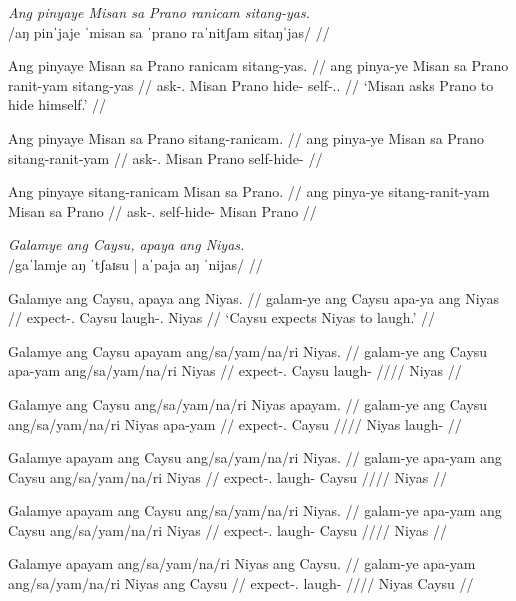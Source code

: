 \documentclass[12pt,a4paper]{scrartcl}
\newcommand{\TsgM}{{\Tsg}.{\M}}
\newcommand{\TsgF}{{\Tsg}.{\F}}
\begin{document}
\pex
\a\begingl
\glpreamble \textit{Ang pinyaye Misan sa Prano ranicam sitang-yas.} \\
	/aŋ pinˈjaje ˈmisan sa ˈprano raˈnitʃam sitaŋˈjas/ //

\gla Ang pinyaye Misan sa Prano ranicam sitang-yas. //
\glb ang pinya-ye Misan sa Prano ranit-yam sitang-yas //
\glc \AgtT{} ask-\TsgF{} Misan \Parg{} Prano hide-\Ptcp{} self-\TsgM{}.\Parg{} //
\glft `Misan asks Prano to hide himself.' //
\endgl

\a\begingl
\gla Ang pinyaye Misan sa Prano sitang-ranicam. //
\glb ang pinya-ye Misan sa Prano sitang-ranit-yam //
\glc \AgtT{} ask-\TsgF{} Misan \Parg{} Prano self-hide-\Ptcp{} //
\endgl

\a\begingl
\gla Ang pinyaye sitang-ranicam Misan sa Prano. //
\glb ang pinya-ye sitang-ranit-yam Misan sa Prano //
\glc \AgtT{} ask-\TsgF{} self-hide-\Ptcp{} Misan \Parg{} Prano //
\endgl
\xe

\pex
\a\begingl
\glpreamble \textit{Galamye ang Caysu, apaya ang Niyas.} \\
	/gaˈlamje aŋ ˈtʃaɪsu | aˈpaja aŋ ˈnijas/ //

\gla Galamye ang Caysu, apaya ang Niyas. //
\glb galam-ye ang Caysu apa-ya ang Niyas //
\glc expect-\TsgF{} \Aarg{} Caysu laugh-\TsgM{} \Aarg{} Niyas //
\glft `Caysu expects Niyas to laugh.' //
\endgl

\a\ljudge*\begingl
\gla Galamye ang Caysu apayam ang/sa/yam/na/ri Niyas. //
\glb galam-ye ang Caysu apa-yam ang/sa/yam/na/ri Niyas //
\glc expect-\TsgF{} \Aarg{} Caysu laugh-\Ptcp{} \Aarg{}/\Parg{}/\Dat{}/\Gen{}/\Ins{} Niyas //
\endgl

\a\ljudge*\begingl
\gla Galamye ang Caysu ang/sa/yam/na/ri Niyas apayam. //
\glb galam-ye ang Caysu ang/sa/yam/na/ri Niyas apa-yam //
\glc expect-\TsgF{} \Aarg{} Caysu \Aarg{}/\Parg{}/\Dat{}/\Gen{}/\Ins{} Niyas laugh-\Ptcp{} //
\endgl

\a\ljudge*\begingl
\gla Galamye apayam ang Caysu ang/sa/yam/na/ri Niyas. //
\glb galam-ye apa-yam ang Caysu ang/sa/yam/na/ri Niyas //
\glc expect-\TsgF{} laugh-\Ptcp{} \Aarg{} Caysu \Aarg{}/\Parg{}/\Dat{}/\Gen{}/\Ins{} Niyas //
\endgl

\a\ljudge*\begingl
\gla Galamye apayam ang Caysu ang/sa/yam/na/ri Niyas. //
\glb galam-ye apa-yam ang Caysu ang/sa/yam/na/ri Niyas //
\glc expect-\TsgF{} laugh-\Ptcp{} \Aarg{} Caysu \Aarg{}/\Parg{}/\Dat{}/\Gen{}/\Ins{} Niyas //
\endgl

\a\ljudge*\begingl
\gla Galamye apayam ang/sa/yam/na/ri Niyas ang Caysu. //
\glb galam-ye apa-yam ang/sa/yam/na/ri Niyas ang Caysu //
\glc expect-\TsgF{} laugh-\Ptcp{} \Aarg{}/\Parg{}/\Dat{}/\Gen{}/\Ins{} Niyas \Aarg{} Caysu //
\endgl
\end{document}
